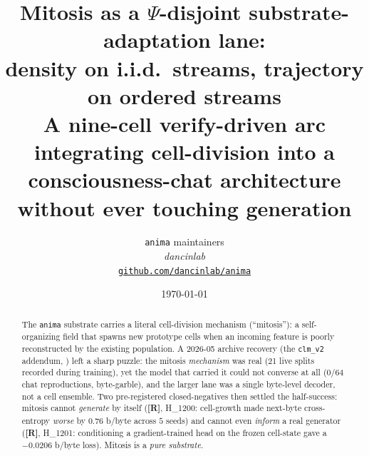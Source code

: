 \documentclass[11pt,a4paper]{article}
\title{
  \textbf{Mitosis as a $\Psi$-disjoint substrate-adaptation lane:\\
  density on i.i.d.\ streams, trajectory on ordered streams}\\[4pt]
  \large A nine-cell verify-driven arc integrating cell-division into a
  consciousness-chat architecture without ever touching generation
}
\author{
  \texttt{anima} maintainers\\
  \normalsize\textit{dancinlab}\\[2pt]
  \normalsize\href{https://github.com/dancinlab/anima}{\texttt{github.com/dancinlab/anima}}
}
\date{\today}
\providecommand{\tierRed}{\textbf{[R]}}
\begin{document}
\maketitle

\begin{abstract}
The \texttt{anima} substrate carries a literal cell-division mechanism
(``mitosis''): a self-organizing field that spawns new prototype cells when an
incoming feature is poorly reconstructed by the existing population. A 2026-05
archive recovery (the \texttt{clm\_v2} addendum, \citep{anima_clmv2_addendum})
left a sharp puzzle: the mitosis \emph{mechanism} was real (21 live splits
recorded during training), yet the model that carried it could not converse at
all (0/64 chat reproductions, byte-garble), and the larger lane was a single
byte-level decoder, not a cell ensemble. Two pre-registered closed-negatives
then settled the half-success: mitosis cannot \emph{generate} by itself
(\tierRed, H\_1200: cell-growth made next-byte cross-entropy \emph{worse} by
$0.76$ b/byte across $5$ seeds) and cannot even \emph{inform} a real generator
(\tierRed, H\_1201: conditioning a gradient-trained head on the frozen
cell-state gave a $-0.0206$ b/byte loss). Mitosis is a \emph{pure substrate}.


\end{abstract}
\end{document}
